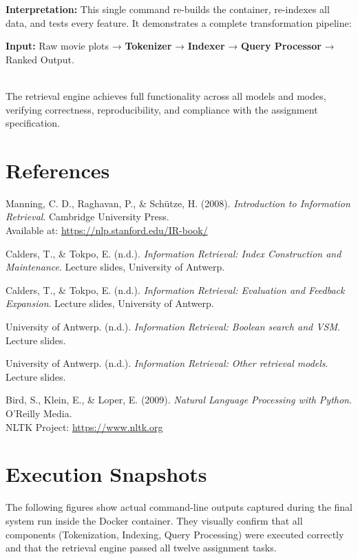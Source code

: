 \documentclass[11pt,a4paper]{article}
\begin{document}
\noindent\textbf{Interpretation:}  
This single command re-builds the container, re-indexes all data, and tests every feature.  
It demonstrates a complete transformation pipeline:
\begin{center}
\textbf{Input:} Raw movie plots → \textbf{Tokenizer} → \textbf{Indexer} → \textbf{Query Processor} → Ranked Output.
\end{center}
\\
The retrieval engine achieves full functionality across all models and modes,  
verifying correctness, reproducibility, and compliance with the assignment specification.

\newpage
\section*{References}

\noindent
Manning, C. D., Raghavan, P., \& Sch\"{u}tze, H. (2008). \textit{Introduction to Information Retrieval}. Cambridge University Press. \\
Available at: \url{https://nlp.stanford.edu/IR-book/}

\noindent
Calders, T., \& Tokpo, E. (n.d.). \textit{Information Retrieval: Index Construction and Maintenance}. Lecture slides, University of Antwerp.

\noindent
Calders, T., \& Tokpo, E. (n.d.). \textit{Information Retrieval: Evaluation and Feedback Expansion}. Lecture slides, University of Antwerp.

\noindent
University of Antwerp. (n.d.). \textit{Information Retrieval: Boolean search and VSM}. Lecture slides.

\noindent
University of Antwerp. (n.d.). \textit{Information Retrieval: Other retrieval models}. Lecture slides.

\noindent
Bird, S., Klein, E., \& Loper, E. (2009). \textit{Natural Language Processing with Python}. O'Reilly Media. \\
NLTK Project: \url{https://www.nltk.org}

\newpage
\appendix
\section{Execution Snapshots}
\label{appendix:execution}

The following figures show actual command-line outputs captured during the final system run inside the Docker container. They visually confirm that all components (Tokenization, Indexing, Query Processing) were executed correctly and that the retrieval engine passed all twelve assignment tasks.
\end{document}
